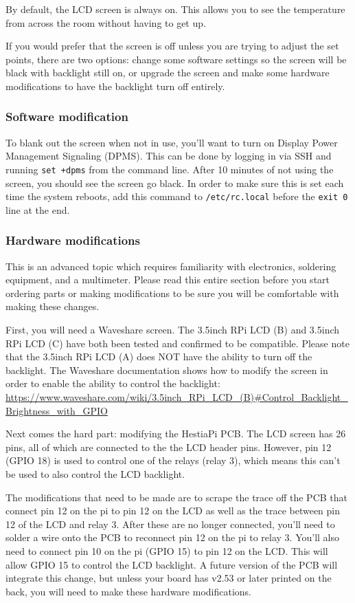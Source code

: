 By default, the LCD screen is always on. This allows you to see the temperature
from across the room without having to get up.

If you would prefer that the screen is off unless you are trying to adjust the
set points, there are two options: change some software settings so the screen
will be black with backlight still on, or upgrade the screen and make some
hardware modifications to have the backlight turn off entirely.

\subsubsection{Software modification}
To blank out the screen when not in use, you'll want to turn on Display Power
Management Signaling (DPMS). This can be done by logging in via SSH and running
\texttt{set +dpms} from the command line. After 10 minutes of not using the screen,
you should see the screen go black. In order to make sure this is set each time
the system reboots, add this command to \texttt{/etc/rc.local} before the
\texttt{exit 0} line at the end.

\subsubsection{Hardware modifications}
This is an advanced topic which requires familiarity with electronics,
soldering equipment, and a multimeter. Please read this entire section before
you start ordering parts or making modifications to be sure you will be
comfortable with making these changes.

First, you will need a Waveshare screen. The 3.5inch RPi LCD (B) and 3.5inch
RPi LCD (C) have both been tested and confirmed to be compatible. Please note
that the 3.5inch RPi LCD (A) does NOT have the ability to turn off the
backlight. The Waveshare documentation shows how to modify the screen in order
to enable the ability to control the backlight:
\url{https://www.waveshare.com/wiki/3.5inch\_RPi\_LCD\_(B)\#Control\_Backlight\_Brightness\_with\_GPIO}

Next comes the hard part: modifying the HestiaPi PCB. The LCD screen has 26
pins, all of which are connected to the the LCD header pins. However, pin 12
(GPIO 18) is used to control one of the relays (relay 3), which means this
can't be used to also control the LCD backlight.

The modifications that need to be made are to scrape the trace off the PCB that
connect pin 12 on the pi to pin 12 on the LCD as well as the trace between pin
12 of the LCD and relay 3. After these are no longer connected, you'll need to
solder a wire onto the PCB to reconnect pin 12 on the pi to relay 3. You'll
also need to connect pin 10 on the pi (GPIO 15) to pin 12 on the LCD. This will
allow GPIO 15 to control the LCD backlight. A future version of the PCB will
integrate this change, but unless your board has v2.53 or later printed on the
back, you will need to make these hardware modifications.

